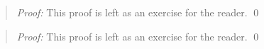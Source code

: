 \begin{quote} 
  \textit{Proof:}
  This proof is left as an exercise for the reader.
  \qed
\end{quote}




\begin{quote} 
  \textit{Proof:}
  This proof is left as an exercise for the reader.
  \qed
\end{quote}




